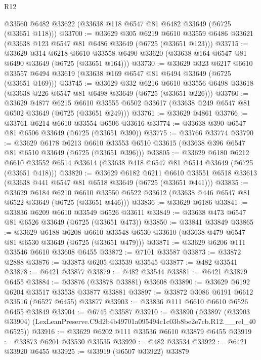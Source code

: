 \begin{lexlean}{R12}
\begin{coremodule}
    @33560
    @6482
    @33622
    (@33638 @118 @6547 @81 @6482 @33649 (@6725 (@33651 @118)))
@33700 := @33629
    @305
    @6219
    @6610
    @33559
    @6486
    @33621
    (@33638 @123 @6547 @81 @6486 @33649 (@6725 (@33651 @123)))
@33715 := @33629
    @314
    @6218
    @6610
    @33558
    @6490
    @33620
    (@33638 @164 @6547 @81 @6490 @33649 (@6725 (@33651 @164)))
@33730 := @33629
    @323
    @6217
    @6610
    @33557
    @6494
    @33619
    (@33638 @169 @6547 @81 @6494 @33649 (@6725 (@33651 @169)))
@33745 := @33629
    @332
    @6216
    @6610
    @33556
    @6498
    @33618
    (@33638 @226 @6547 @81 @6498 @33649 (@6725 (@33651 @226)))
@33760 := @33629
    @4877
    @6215
    @6610
    @33555
    @6502
    @33617
    (@33638 @249 @6547 @81 @6502 @33649 (@6725 (@33651 @249)))
@33761 := @33629 @4861
@33766 := @33761 @6214 @6610 @33554 @6506 @33616
@33774 := @33638 @390 @6547 @81 @6506 @33649 (@6725 (@33651 @390))
@33775 := @33766 @33774
@33790 := @33629
    @6178
    @6213
    @6610
    @33553
    @6510
    @33615
    (@33638 @396 @6547 @81 @6510 @33649 (@6725 (@33651 @396)))
@33805 := @33629
    @6180
    @6212
    @6610
    @33552
    @6514
    @33614
    (@33638 @418 @6547 @81 @6514 @33649 (@6725 (@33651 @418)))
@33820 := @33629
    @6182
    @6211
    @6610
    @33551
    @6518
    @33613
    (@33638 @441 @6547 @81 @6518 @33649 (@6725 (@33651 @441)))
@33835 := @33629
    @6184
    @6210
    @6610
    @33550
    @6522
    @33612
    (@33638 @446 @6547 @81 @6522 @33649 (@6725 (@33651 @446)))
@33836 := @33629 @6186
@33841 := @33836 @6209 @6610 @33549 @6526 @33611
@33849 := @33638 @473 @6547 @81 @6526 @33649 (@6725 (@33651 @473))
@33850 := @33841 @33849
@33865 := @33629
    @6188
    @6208
    @6610
    @33548
    @6530
    @33610
    (@33638 @479 @6547 @81 @6530 @33649 (@6725 (@33651 @479)))
@33871 := @33629 @6206 @111 @33546 @6610 @33608 @6455
@33872 := @7101 @33587
@33873 := @33872 @2888
@33876 := @33873 @6205 @33539 @33545
@33877 := @482 @33541
@33878 := @6421 @33877
@33879 := @482 @33544
@33881 := @6421 @33879 @6455
@33884 := @33876 (@33878 @33881) @33608
@33890 := @33629 @6192 @6204 @33517 @33538 @33877 @33881
@33897 := @33872 @3086 @6191 @6612 @33516 (@6527 @6455) @33877
@33903 := @33836 @111 @6610 @6610 @6526 @6455 @33849
@33904 := @6745 @33587
@33910 := @33890
    (@33897 (@33903 @33904) (LexLeanPreserve.C9d2b4b49701a095494c1c03b8be2e7cb.R12.__rel_40 @6525))
@33916 := @33629 @6202 @111 @33536 @6610 @33879 @6455
@33919 := @33873 @6201 @33530 @33535
@33920 := @482 @33534
@33922 := @6421 @33920 @6455
@33925 := @33919 (@6507 @33922) @33879

\end{coremodule}
\end{lexlean}
